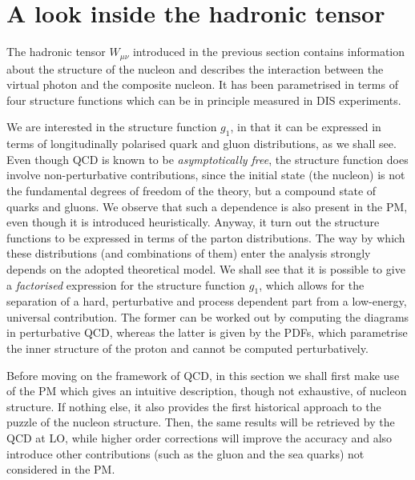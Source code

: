 \section{A look inside the hadronic tensor}
The hadronic tensor $W_{\mu \nu}$ introduced in the previous section contains information about the structure of the nucleon and describes the interaction between the virtual photon and the composite nucleon. It has been parametrised in terms of four structure functions which can be in principle measured in DIS experiments.\par
We are interested in the structure function $g_1$, in that it can be expressed in terms of longitudinally polarised quark and gluon distributions, as we shall see. Even though QCD is known to be \textit{asymptotically free}, the structure function does involve non-perturbative contributions, since the initial state (the nucleon) is not the fundamental degrees of freedom of the theory, but a compound state of quarks and gluons. We observe that such a dependence is also present in the PM, even though it is introduced heuristically. Anyway, it turn out the structure functions to be expressed in terms of the parton distributions. The way by which these distributions (and combinations of them) enter the analysis strongly depends on the adopted theoretical model. We shall see that it is possible to give a \textit{factorised} expression for the structure function $g_1$, which allows for the separation of a hard, perturbative and process dependent part from a low-energy, universal contribution. The former can be worked out by computing the diagrams in perturbative QCD, whereas the latter is given by the PDFs, which parametrise the inner structure of the proton and cannot be computed perturbatively.\par
Before moving on the framework of QCD, in this section we shall first make use of the PM which gives an intuitive description, though not exhaustive, of nucleon structure. If nothing else, it also provides the first historical approach to the puzzle of the nucleon structure. Then, the same results will be retrieved by the QCD at LO, while higher order corrections will improve the accuracy and also introduce other contributions (such as the gluon and the sea quarks) not considered in the PM.


